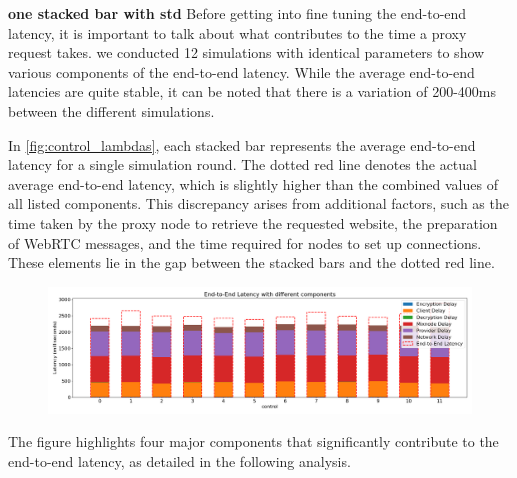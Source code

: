 \documentclass[a4paper,11pt,oneside]{report}
\begin{document}
\textbf{one stacked bar with std}
Before getting into fine tuning the end-to-end latency, it is important to talk about what contributes to the time a proxy request takes. we conducted 12 simulations with identical parameters to show various components of the end-to-end latency. While the average end-to-end latencies are quite stable, it can be noted that there is a variation of 200-400ms between the different simulations.

In \autoref{fig:control_lambdas}, each stacked bar represents the average end-to-end latency for a single simulation round. The dotted red line denotes the actual average end-to-end latency, which is slightly higher than the combined values of all listed components. This discrepancy arises from additional factors, such as the time taken by the proxy node to retrieve the requested website, the preparation of WebRTC messages, and the time required for nodes to set up connections. These elements lie in the gap between the stacked bars and the dotted red line.


\begin{figure}[htbp]
    \centering
    \includegraphics[width=\textwidth]{plots/control_latency_components.png}
    \caption{}
    \label{fig:control_lambdas}
\end{figure}

The figure highlights four major components that significantly contribute to the end-to-end latency, as detailed in the following analysis.
\end{document}
